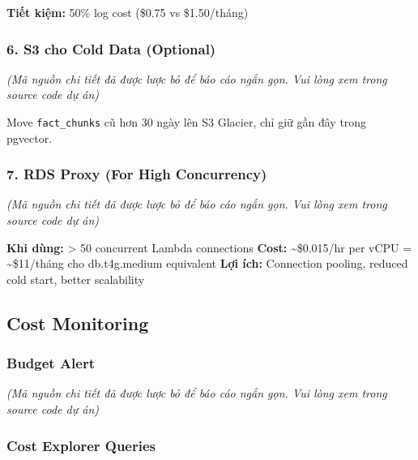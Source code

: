 \begin{Shaded}
\begin{Highlighting}[]
\NormalTok{\}}
\end{Highlighting}
\end{Shaded}

\textbf{Tiết kiệm:} 50\% log cost (\$0.75 vs \$1.50/tháng)

\hypertarget{s3-cho-cold-data-optional}{%
\subsubsection{6. S3 cho Cold Data
(Optional)}}

\emph{(Mã nguồn chi tiết đã được lược bỏ để báo cáo ngắn gọn. Vui lòng
xem trong source code dự án)}

Move \texttt{fact\_chunks} cũ hơn 30 ngày lên S3 Glacier, chỉ giữ gần
đây trong pgvector.

\hypertarget{rds-proxy-for-high-concurrency}{%
\subsubsection{7. RDS Proxy (For High
Concurrency)}}

\emph{(Mã nguồn chi tiết đã được lược bỏ để báo cáo ngắn gọn. Vui lòng
xem trong source code dự án)}

\textbf{Khi dùng:} \textgreater{} 50 concurrent Lambda connections
\textbf{Cost:} \textasciitilde\$0.015/hr per vCPU =
\textasciitilde\$11/tháng cho db.t4g.medium equivalent \textbf{Lợi ích:}
Connection pooling, reduced cold start, better scalability

\hypertarget{cost-monitoring}{%
\subsection{Cost Monitoring}}

\hypertarget{budget-alert}{%
\subsubsection{Budget Alert}}

\emph{(Mã nguồn chi tiết đã được lược bỏ để báo cáo ngắn gọn. Vui lòng
xem trong source code dự án)}

\hypertarget{cost-explorer-queries}{%
\subsubsection{Cost Explorer Queries}}

